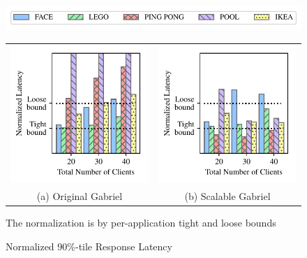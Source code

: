 \begin{figure}[]
	\begin{center}
		\includegraphics[width=\linewidth]{FIGS/fig-alloc-latency-legend.pdf}
								
		\begin{tabular}{c@{}c}
			\includegraphics[width=.5\linewidth]{FIGS/fig-eval-latency-baseline.pdf}
			            & \includegraphics[width=.5\linewidth]{FIGS/fig-eval-latency-cpushares.pdf} \\
			{(a) Original  Gabriel} & {(b) Scalable Gabriel}                                                    
		\end{tabular}
	\end{center}

\begin{captiontext}
\centering
The normalization is by per-application tight and loose bounds~\cite{chen2017empirical}
\end{captiontext}
\vspace{-0.1in}
	\caption{\small Normalized 90\%-tile Response Latency}
	\label{fig:frame-latency}
\end{figure}

